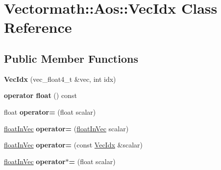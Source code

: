 \hypertarget{classVectormath_1_1Aos_1_1VecIdx}{\section{Vectormath\-:\-:Aos\-:\-:Vec\-Idx Class Reference}
\label{classVectormath_1_1Aos_1_1VecIdx}
}
\subsection*{Public Member Functions}
\begin{DoxyCompactItemize}
\item 
\hypertarget{classVectormath_1_1Aos_1_1VecIdx_ad1b0d58575c706efba5591db93eae084}{{\bfseries Vec\-Idx} (vec\-\_\-float4\-\_\-t \&vec, int idx)}\label{classVectormath_1_1Aos_1_1VecIdx_ad1b0d58575c706efba5591db93eae084}

\item 
\hypertarget{classVectormath_1_1Aos_1_1VecIdx_a07473426600b7271c5ae484c7a907520}{{\bfseries operator float} () const }\label{classVectormath_1_1Aos_1_1VecIdx_a07473426600b7271c5ae484c7a907520}

\item 
\hypertarget{classVectormath_1_1Aos_1_1VecIdx_a58ae7653875533e2c3e7bb7a2ad03545}{float {\bfseries operator=} (float scalar)}\label{classVectormath_1_1Aos_1_1VecIdx_a58ae7653875533e2c3e7bb7a2ad03545}

\item 
\hypertarget{classVectormath_1_1Aos_1_1VecIdx_a35de28946a701698c13a5cb4dbe1289b}{\hyperlink{classVectormath_1_1floatInVec}{float\-In\-Vec} {\bfseries operator=} (\hyperlink{classVectormath_1_1floatInVec}{float\-In\-Vec} scalar)}\label{classVectormath_1_1Aos_1_1VecIdx_a35de28946a701698c13a5cb4dbe1289b}

\item 
\hypertarget{classVectormath_1_1Aos_1_1VecIdx_a907abfa83bed3474ad8b4b609a5d7783}{\hyperlink{classVectormath_1_1floatInVec}{float\-In\-Vec} {\bfseries operator=} (const \hyperlink{classVectormath_1_1Aos_1_1VecIdx}{Vec\-Idx} \&scalar)}\label{classVectormath_1_1Aos_1_1VecIdx_a907abfa83bed3474ad8b4b609a5d7783}

\item 
\hypertarget{classVectormath_1_1Aos_1_1VecIdx_ae82c6bf1b95a08d93061b0604b2d91eb}{\hyperlink{classVectormath_1_1floatInVec}{float\-In\-Vec} {\bfseries operator$\ast$=} (float scalar)}\label{classVectormath_1_1Aos_1_1VecIdx_ae82c6bf1b95a08d93061b0604b2d91eb}


\end{DoxyCompactItemize}
